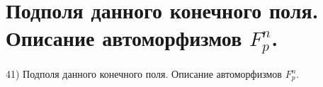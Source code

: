 \section{
 Подполя данного конечного поля. Описание автоморфизмов $F_p^n$.
}

41) Подполя данного конечного поля. Описание автоморфизмов $F_p^n$.

